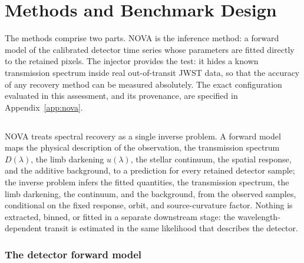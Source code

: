 \section{Methods and Benchmark Design}
\label{sec:methods}


The methods comprise two parts. NOVA is the inference method: a forward
model of the calibrated detector time series whose parameters are fitted
directly to the retained pixels. The injector provides the test: it hides
a known transmission spectrum inside real out-of-transit JWST data, so
that the accuracy of any recovery method can be measured absolutely. The
exact configuration evaluated in this assessment, and its provenance, are
specified in Appendix~\ref{app:nova}.

\subsection{\nova{}}


NOVA treats spectral recovery as a single inverse problem. A forward
model maps the physical description of the observation, the transmission
spectrum $D(\lambda)$, the limb darkening $u(\lambda)$, the stellar
continuum, the spatial response, and the additive background, to a
prediction for every retained detector sample; the inverse problem infers
the fitted quantities, the transmission spectrum, the limb darkening, the
continuum, and the background, from the observed samples, conditional on
the fixed response, orbit, and source-curvature factor. Nothing is extracted, binned,
or fitted in a separate downstream stage: the wavelength-dependent
transit is estimated in the same likelihood that describes the detector.

\subsubsection{The detector forward model}

